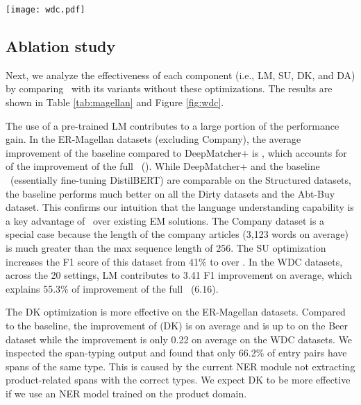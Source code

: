 \begin{figure*}[]
    \centering
    \texttt{[image: wdc.pdf]}
    \vspace{-3mm}
    \caption{\small F1 scores on the WDC datasets of different versions of \system. \textbf{DM}: DeepMatcher.}
    \label{fig:wdc}
    \vspace{-3mm}
\end{figure*}













\vspace{-1mm}
\subsection{Ablation study}


Next, we analyze the effectiveness of each component (i.e., LM, SU, DK, and DA)
by comparing \system\ with its variants without these optimizations.
The results are shown in Table \ref{tab:magellan} and Figure \ref{fig:wdc}.

The use of a pre-trained LM contributes to a large portion of the performance gain.
In the ER-Magellan datasets (excluding Company), the average improvement of the baseline 
compared to DeepMatcher+ is , which accounts for  of the improvement of the full \system\ ().
While DeepMatcher+ and the baseline \system\ (essentially fine-tuning DistilBERT) 
are comparable on the Structured datasets, the baseline performs much better on all the Dirty datasets
and the Abt-Buy dataset. This confirms our intuition that the language understanding
capability is a key advantage of \system\ over existing EM solutions.
The Company dataset is a special case because the length of the company articles (3,123 words on average)
is much greater than the max sequence length of 256. 
The SU optimization increases the F1 score of this dataset from 41\% to over .
In the WDC datasets, across the 20 settings, LM contributes to 3.41 F1 improvement on average, which explains 55.3\% of improvement of the full \system\ (6.16).

The DK optimization is more effective on the ER-Magellan datasets.
Compared to the baseline, the improvement of \system(DK) is  on average and 
is up to  on the Beer dataset
while the improvement is only 0.22 on average on the WDC datasets.
We inspected the span-typing output and found that only 66.2\% of entry pairs have spans of the same type. This is caused by the current NER module not extracting product-related spans with the correct types. We expect DK to be more effective if we use
an NER model trained on the product domain.

